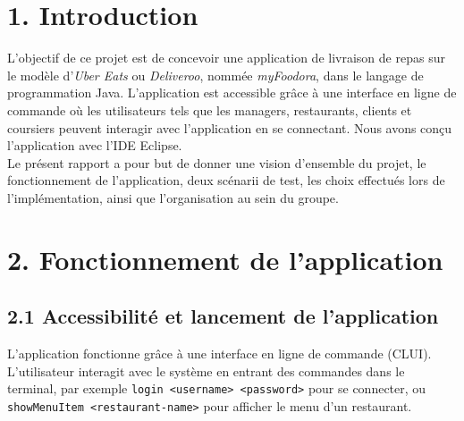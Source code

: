 \section*{1. Introduction}
\label{ch:Introduction}

L'objectif de ce projet est de concevoir une application de livraison de repas sur le modèle d'\textit{Uber Eats} ou \textit{Deliveroo}, nommée \textit{myFoodora}, dans le langage de programmation Java. L'application est accessible grâce à une interface en ligne de commande où les utilisateurs tels que les managers, restaurants, clients et coursiers peuvent interagir avec l'application en se connectant. Nous avons conçu l'application avec l'IDE Eclipse.\\

Le présent rapport a pour but de donner une vision d'ensemble du projet, le fonctionnement de l'application, deux scénarii de test, les choix effectués lors de l'implémentation, ainsi que l'organisation au sein du groupe.

\section*{2. Fonctionnement de l'application}

\subsection*{2.1 Accessibilité et lancement de l'application}

L'application fonctionne grâce à une interface en ligne de commande (CLUI). L'utilisateur interagit avec le système en entrant des commandes dans le terminal, par exemple \texttt{login <username> <password>} pour se connecter, ou \texttt{showMenuItem <restaurant-name>} pour afficher le menu d'un restaurant.\\

